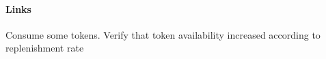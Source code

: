 \label{TC-201}
\paragraph{Links} 

\begin{testprocedure}
    \stage Consume some tokens.
    \stage Verify that token availability increased according to replenishment rate
\end{testprocedure}
